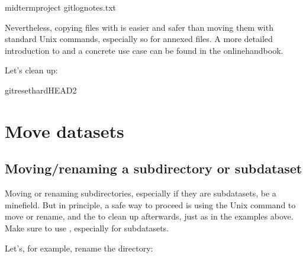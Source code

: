 \begin{sphinxVerbatim}[commandchars=\\\{\}]
midterm\PYGZus{}project
gitlognotes.txt

\end{sphinxVerbatim}

\sphinxAtStartPar
Nevertheless, copying files with  is easier and safer
than moving them with standard Unix commands, especially so for annexed files.
A more detailed introduction to  and a concrete
use case can be found in the online\sphinxhyphen{}handbook.

\sphinxAtStartPar
Let’s clean up:

\begin{sphinxVerbatim}[commandchars=\\\{\}]
gitreset\PYGZhy{}\PYGZhy{}hardHEAD\PYGZti{}2
\end{sphinxVerbatim}


\section{Move datasets}
\label{\detokenize{basics/101-136-filesystem:move-datasets}}

\subsection{Moving/renaming a subdirectory or subdataset}
\label{\detokenize{basics/101-136-filesystem:moving-renaming-a-subdirectory-or-subdataset}}
\sphinxAtStartPar
Moving or renaming subdirectories, especially if they are subdatasets,
 be a minefield. But in principle, a safe way to proceed is using
the Unix  command to move or rename, and the 
to clean up afterwards, just as in the examples above. Make sure to
 use , especially for subdatasets.

\sphinxAtStartPar
Let’s, for example, rename the  directory:

